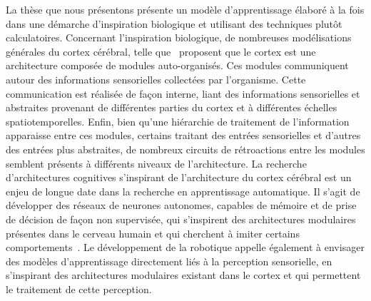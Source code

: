 La thèse que nous présentons présente un modèle d'apprentissage élaboré à la fois dans une démarche d'inspiration biologique et utilisant des techniques plutôt calculatoires.
Concernant l'inspiration biologique, de nombreuses modélisations générales du cortex cérébral, telle que~\cite{binzegger05, Meunier2009HierarchicalMI,sporns_structure_2013,betzel_multi-scale_2017} proposent que le cortex est une architecture composée de modules auto-organisés.
Ces modules communiquent autour des informations sensorielles collectées par l'organisme. Cette communication est réalisée de façon interne, liant des informations sensorielles et abstraites provenant de différentes parties du cortex et à différentes échelles spatiotemporelles. Enfin, bien qu'une hiérarchie de traitement de l'information apparaisse entre ces modules, certains traitant des entrées sensorielles et d'autres des entrées plus abstraites, de nombreux circuits de rétroactions entre les modules semblent présents à différents niveaux de l'architecture.
La recherche d'architectures cognitives s'inspirant de l'architecture du cortex cérébral est un enjeu de longue date dans la recherche en apprentissage automatique. Il s'agit de développer des réseaux de neurones autonomes, capables de mémoire et de prise de décision de façon non supervisée, qui s'inspirent des architectures modulaires présentes dans le cerveau humain et qui cherchent à imiter certains comportements~\cite{Kotseruba201840YO}.
Le développement de la robotique appelle également à envisager des modèles d'apprentissage directement liés à la perception sensorielle, en s'inspirant des architectures modulaires existant dans le cortex et qui permettent le traitement de cette perception.

